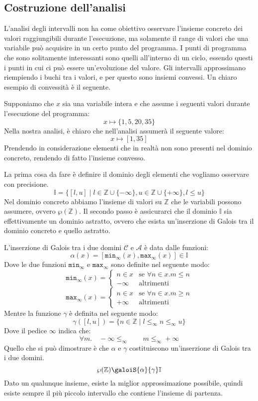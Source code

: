 \subsection{Costruzione dell'analisi}
L'analisi degli intervalli non ha come obiettivo osservare l'insieme 
concreto dei valori raggiungibili durante l'esecuzione, ma solamente il range 
di valori che una variabile può acquisire in un certo punto del programma.
I punti di programma che sono solitamente interessanti sono quelli all'interno di 
un ciclo, essendo questi i punti in cui ci può essere un'evoluzione
del valore. Gli intervalli approssimano riempiendo i buchi tra i valori, e 
per questo sono insiemi convessi. Un chiaro esempio di convessità è 
il seguente.

Supponiamo che $x$ sia una variabile intera e
che assume i seguenti valori durante l'esecuzione del programma:
\[
    x \mapsto \{1, 5, 20, 35\}
\]
Nella nostra analisi, è chiaro che nell'analisi assumerà 
il seguente valore:
\[
  x \mapsto [1, 35]  
\]
Prendendo in considerazione elementi che in realtà non sono presenti nel
dominio concreto, rendendo di fatto l'insieme convesso.

La prima cosa da fare è definire il dominio degli elementi che vogliamo 
osservare con precisione.
\[
  \mathbb{I}  = \{ [l, u] \mid l \in \mathbb{Z} \cup \{-\infty\}, 
  u \in \mathbb{Z} \cup \{+\infty\}, l \leq u \}
\]
Nel dominio concreto abbiamo l'insieme di valori su $\mathbb{Z}$ che 
le variabili possono assumere, ovvero $\wp(\mathbb{Z})$.
Il secondo passo è assicurarci che il dominio $\mathbb{I}$
sia effettivamente un 
dominio astratto, ovvero che esista un'inserzione di Galois
tra il dominio concreto e quello astratto.

L'inserzione di Galois tra i due domini $\mathcal{C}$ e $\mathcal{A}$ è 
data dalle funzioni: 
\[
    \alpha(x) = 
    [\texttt{min}_\infty (x), \texttt{max}_\infty (x)] \in \mathbb{I}
\]
Dove le due funzioni $\texttt{min}_\infty$ e $\texttt{max}_\infty$ sono definite 
nel seguente modo:
\[
    \texttt{min}_\infty (x) = 
    \begin{cases}
        n \in x & \text{se } \forall n \in x . m \leq n \\
        -\infty & \text{altrimenti}
    \end{cases}
\]
\[
    \texttt{max}_\infty (x) = 
    \begin{cases}
        n \in x & \text{se } \forall n \in x . m \geq n \\
        +\infty & \text{altrimenti}
    \end{cases}
\]
Mentre la funzione $\gamma$ è definita nel seguente modo:
\[
    \gamma([l, u]) = \{n \in \mathbb{Z} \mid l \leq_\infty n \leq_\infty u\}
\]
Dove il pedice $\infty$ indica che:
\[
  \forall m . \quad -\infty \leq_\infty \qquad m \leq_\infty +\infty  
\]
Quello che si può dimostrare è che $\alpha$ e $\gamma$ costituiscono 
un'inserzione di Galois tra i due domini.
\[
  \wp(\mathbb{Z}) \galoiS{\alpha}{\gamma} \mathbb{I}
\]
Dato un qualunque insieme, esiste la miglior approssimazione possibile, 
quindi esiste sempre il più piccolo intervallo che contiene l'insieme 
di partenza.
